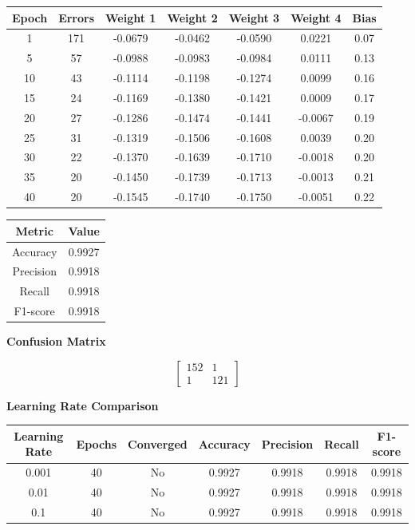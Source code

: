 \documentclass[11pt]{article}
\begin{document}
\begin{tabular}{|c|c|c|c|c|c|c|}
\hline
Epoch & Errors & Weight 1 & Weight 2 & Weight 3 & Weight 4 & Bias \\
\hline
1  & 171 & -0.0679 & -0.0462 & -0.0590 &  0.0221 & 0.07 \\
\hline
5  & 57  & -0.0988 & -0.0983 & -0.0984 &  0.0111 & 0.13 \\
\hline
10 & 43  & -0.1114 & -0.1198 & -0.1274 &  0.0099 & 0.16 \\
\hline
15 & 24  & -0.1169 & -0.1380 & -0.1421 &  0.0009 & 0.17 \\
\hline
20 & 27  & -0.1286 & -0.1474 & -0.1441 & -0.0067 & 0.19 \\
\hline
25 & 31  & -0.1319 & -0.1506 & -0.1608 &  0.0039 & 0.20 \\
\hline
30 & 22  & -0.1370 & -0.1639 & -0.1710 & -0.0018 & 0.20 \\
\hline
35 & 20  & -0.1450 & -0.1739 & -0.1713 & -0.0013 & 0.21 \\
\hline
40 & 20  & -0.1545 & -0.1740 & -0.1750 & -0.0051 & 0.22 \\
\hline
\end{tabular}

\vspace{6mm}


\vspace{2mm}

\begin{tabular}{|c|c|}
\hline
Metric & Value\\
\hline
Accuracy & 0.9927\\
\hline
Precision & 0.9918\\
\hline
Recall & 0.9918\\
\hline
F1-score & 0.9918\\
\hline
\end{tabular}

\vspace{5mm}

\textbf{Confusion Matrix}

\[
\begin{bmatrix}
152 & 1\\
1 & 121
\end{bmatrix}
\]

\vspace{6mm}

\textbf{Learning Rate Comparison}

\vspace{2mm}

\begin{tabular}{|c|c|c|c|c|c|c|}
\hline
Learning Rate & Epochs & Converged & Accuracy & Precision & Recall & F1-score\\
\hline
0.001 & 40 & No & 0.9927 & 0.9918 & 0.9918 & 0.9918\\
\hline
0.01 & 40 & No & 0.9927 & 0.9918 & 0.9918 & 0.9918\\
\hline
0.1 & 40 & No & 0.9927 & 0.9918 & 0.9918 & 0.9918\\
\hline
\end{tabular}
\end{document}
